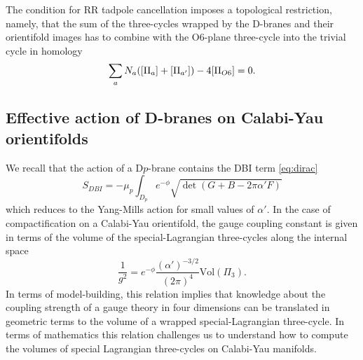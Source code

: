 The condition for RR tadpole cancellation imposes a topological restriction, namely, 
that the sum of the three-cycles wrapped by the D-branes and their orientifold images
has to combine with the O$6$-plane three-cycle into the trivial cycle in homology
\begin{equation}
  \sum_a N_a \qty([\Pi_a] + [\Pi_{a'}]) - 4 [\Pi_{O6}]=0.
\end{equation}

\subsection{Effective action of D-branes on Calabi-Yau orientifolds}
We recall that the action of a D$p$-brane contains the DBI term \eqref{eq:dirac}
\begin{equation}
  S_{DBI} = -\mu_p \int_{D_p} e^{-\phi}\sqrt{\det (G+B-2\pi \alpha' F)}
\end{equation}
which reduces to the Yang-Mills action for small values of $\alpha'$.
In the case of compactification on a Calabi-Yau orientifold, the gauge coupling  constant is given
in terms of the volume of the special-Lagrangian three-cycles along the internal space
\begin{equation}
  \frac{1}{g^2}=e^{-\phi}\frac{(\alpha')^{-3/2}}{(2\pi)^{4}}\mathrm{Vol}(\Pi_{3}).
\end{equation}
In terms of model-building, this relation implies that knowledge about the coupling strength of a gauge theory in four dimensions can be translated in geometric terms to the volume of a wrapped special-Lagrangian three-cycle.
In terms of mathematics this relation challenges us to understand how to compute the volumes of special Lagrangian three-cycles on Calabi-Yau manifolds.
